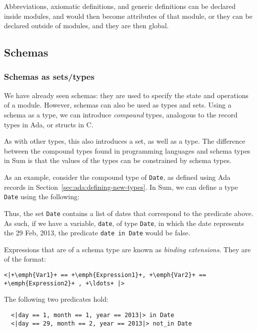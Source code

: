 Abbreviations, axiomatic definitions, and generic definitions can be declared inside modules, and would then become attributes of that module, or they can be declared outside of modules, and they are then global.

\subsection{Schemas}

\subsubsection{Schemas as sets/types}

We have already seen schemas: they are used to specify the state and operations of a module. However, schemas can also be used as types and sets. Using a schema as a type, we can introduce \emph{compound} types, analogous to the record types in Ada, or structs in C.

As with other types, this also introduces a set, as well as a type. The difference between the compound types found in programming languages and schema types in Sum is that the values of the types can be constrained by schema types.

\begin{example}
As an example, consider the compound type of \texttt{Date}, as defined using Ada records in Section~\ref{sec:ada:defining-new-types}. In Sum, we can define a type \texttt{Date} using the following:

\lstset{aboveskip=3mm}


Thus, the set \texttt{Date} contains a list of dates that correspond to the predicate above. As such, if we have a variable, \texttt{date}, of type \texttt{Date}, in which the date represents the 29 Feb, 2013, the predicate \texttt{date in Date} would be false.

\end{example}

Expressions that are of a schema type are known as \emph{binding extensions}. They are of the format:

\lstset{aboveskip=3mm}
\begin{lstlisting}[escapeinside={++}]
  <|+\emph{Var1}+ == +\emph{Expression1}+, +\emph{Var2}+ == +\emph{Expression2}+ , +\ldots+ |>
\end{lstlisting}

\begin{example}
The following two predicates hold:

\begin{lstlisting}
  <|day == 1, month == 1, year == 2013|> in Date
  <|day == 29, month == 2, year == 2013|> not_in Date
\end{lstlisting}

\end{example}

